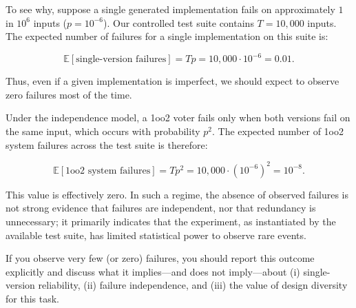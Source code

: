 To see why, suppose a single generated implementation fails on approximately $1$ in $10^6$ inputs (\ie $p = 10^{-6}$).
Our controlled test suite contains $T = 10{,}000$ inputs.
The expected number of failures for a single implementation on this suite is:

\[
\mathbb{E}[\text{single-version failures}] = Tp = 10{,}000 \cdot 10^{-6} = 0.01.
\]

Thus, even if a given implementation is imperfect, we should expect to observe zero failures most of the time.

Under the independence model, a 1oo2 voter fails only when both versions fail on the same input, which occurs with probability $p^2$.
The expected number of 1oo2 system failures across the test suite is therefore:

\[
\mathbb{E}[\text{1oo2 system failures}] = T p^2 = 10{,}000 \cdot (10^{-6})^2 = 10^{-8}.
\]

This value is effectively zero.
In such a regime, the absence of observed failures is not strong evidence that failures are independent, nor that redundancy is unnecessary; it primarily indicates that the experiment, as instantiated by the available test suite, has limited statistical power to observe rare events.

If you observe very few (or zero) failures, you should report this outcome explicitly and discuss what it implies---and does not imply---about (i) single-version reliability, (ii) failure independence, and (iii) the value of design diversity for this task.
